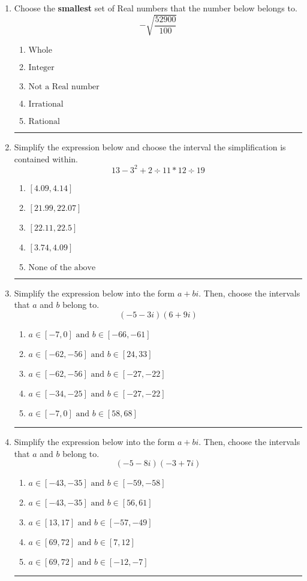 \documentclass[14pt]{extbook}
\newcommand{\litem}[1]{\item#1\hspace*{-1cm}\rule{\textwidth}{0.4pt}}
\begin{document}
\begin{enumerate}
{\begin{enumerate}[label=\Alph*.]
\end{enumerate} }
\litem{
Choose the \textbf{smallest} set of Real numbers that the number below belongs to.\[ -\sqrt{\frac{52900}{100}} \]\begin{enumerate}[label=\Alph*.]
\item \( \text{Whole} \)
\item \( \text{Integer} \)
\item \( \text{Not a Real number} \)
\item \( \text{Irrational} \)
\item \( \text{Rational} \)

\end{enumerate} }
\litem{
Simplify the expression below and choose the interval the simplification is contained within.\[ 13 - 3^2 + 2 \div 11 * 12 \div 19 \]\begin{enumerate}[label=\Alph*.]
\item \( [4.09, 4.14] \)
\item \( [21.99, 22.07] \)
\item \( [22.11, 22.5] \)
\item \( [3.74, 4.09] \)
\item \( \text{None of the above} \)

\end{enumerate} }
\litem{
Simplify the expression below into the form $a+bi$. Then, choose the intervals that $a$ and $b$ belong to.\[ (-5 - 3 i)(6 + 9 i) \]\begin{enumerate}[label=\Alph*.]
\item \( a \in [-7, 0] \text{ and } b \in [-66, -61] \)
\item \( a \in [-62, -56] \text{ and } b \in [24, 33] \)
\item \( a \in [-62, -56] \text{ and } b \in [-27, -22] \)
\item \( a \in [-34, -25] \text{ and } b \in [-27, -22] \)
\item \( a \in [-7, 0] \text{ and } b \in [58, 68] \)

\end{enumerate} }
\litem{
Simplify the expression below into the form $a+bi$. Then, choose the intervals that $a$ and $b$ belong to.\[ (-5 - 8 i)(-3 + 7 i) \]\begin{enumerate}[label=\Alph*.]
\item \( a \in [-43, -35] \text{ and } b \in [-59, -58] \)
\item \( a \in [-43, -35] \text{ and } b \in [56, 61] \)
\item \( a \in [13, 17] \text{ and } b \in [-57, -49] \)
\item \( a \in [69, 72] \text{ and } b \in [7, 12] \)
\item \( a \in [69, 72] \text{ and } b \in [-12, -7] \)


\end{enumerate}}
\end{enumerate}
\end{document}

